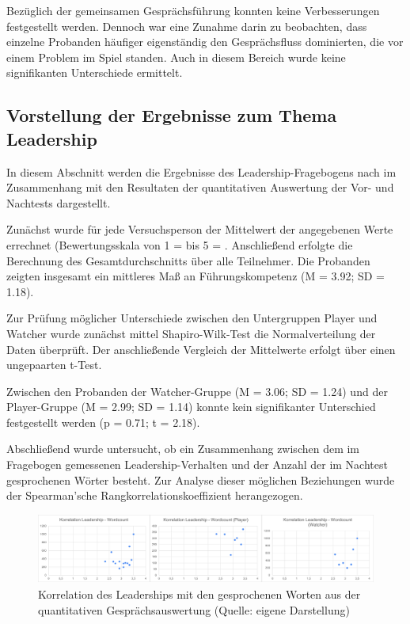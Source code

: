 Bezüglich der gemeinsamen Gesprächsführung konnten keine Verbesserungen festgestellt werden. Dennoch war eine Zunahme darin zu beobachten, dass einzelne Probanden häufiger eigenständig den Gesprächsfluss dominierten, die vor einem Problem im Spiel standen. Auch in diesem Bereich wurde keine signifikanten Unterschiede ermittelt.


\subsection{Vorstellung der Ergebnisse zum Thema Leadership}

In diesem Abschnitt werden die Ergebnisse des Leadership-Fragebogens nach \cite{emmerich_game_2016} im Zusammenhang mit den Resultaten der quantitativen Auswertung der Vor- und Nachtests dargestellt.

Zunächst wurde für jede Versuchsperson der Mittelwert der angegebenen Werte errechnet (Bewertungsskala von 1 =  bis 5 = . Anschließend erfolgte die Berechnung des Gesamtdurchschnitts über alle Teilnehmer. Die Probanden zeigten insgesamt ein mittleres Maß an Führungskompetenz (M = 3.92; SD = 1.18). 

Zur Prüfung möglicher Unterschiede zwischen den Untergruppen Player und Watcher wurde zunächst mittel Shapiro-Wilk-Test die Normalverteilung der Daten überprüft. Der anschließende Vergleich der Mittelwerte erfolgt über einen ungepaarten t-Test.

Zwischen den Probanden der Watcher-Gruppe (M = 3.06; SD = 1.24) und der Player-Gruppe (M = 2.99; SD = 1.14) konnte kein signifikanter Unterschied festgestellt werden (p = 0.71; t = 2.18).

Abschließend wurde untersucht, ob ein Zusammenhang zwischen dem im Fragebogen gemessenen Leadership-Verhalten und der Anzahl der im Nachtest gesprochenen Wörter besteht. Zur Analyse dieser möglichen Beziehungen wurde der  Spearman'sche Rangkorrelationskoeffizient herangezogen.

\begin{figure}[ht]
\centering
\includegraphics[width=1\linewidth]{content/pictures/Korrelation_Leadership_Wordcount_full.png}
\caption{Korrelation des Leaderships mit den gesprochenen Worten aus der quantitativen Gesprächsauswertung (Quelle: eigene Darstellung)}
\label{fig:correlation_leadership_wordcount}
\end{figure}

